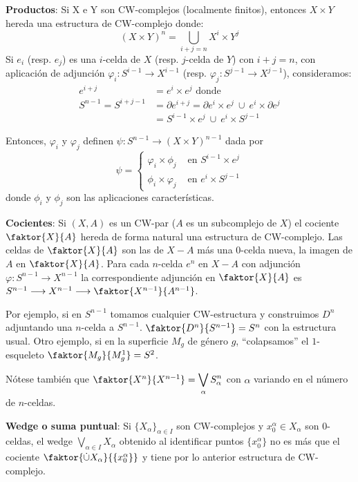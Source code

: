 \textbf{Productos}:  Si X e Y son CW-complejos (localmente finitos), entonces $X \times Y$ hereda una estructura de CW-complejo donde:
\[ (X \times Y)^n = \bigcup_{i+j=n} X^i \times Y^j \]
Si $e_i$ (resp. $e_j$) es una $i$-celda de $X$ (resp. $j$-celda de $Y$) con $i+j=n$, con aplicación de adjunción $\varphi_i : S^{i-1} \longrightarrow X^{i-1}$ (resp. $\varphi_j : S^{j-1} \longrightarrow X^{j-1}$), consideramos:
\begin{align*} 
e^{i+j} &= e^i \times e^j \text{ donde } \\
S^{n-1} = S^{i+j-1} &= \partial e^{i+j} = \partial e^i \times e^j \ \cup \ e^i \times \partial e^j \\
&= S^{i-1} \times e^j \ \cup \ e^i \times S^{j-1}
\end{align*}

Entonces, $\varphi_i$ y $\varphi_j$ definen $\psi : S^{n-1} \longrightarrow (X \times Y)^{n-1}$ dada por 
\[ \psi = \begin{cases}
\varphi_i  \times \phi_j & \text{ en } S^{i-1} \times e^j \\
\phi_i \times \varphi_j & \text{ en } e^i \times S^{j-1}
\end{cases} \]
donde $\phi_i$ y $\phi_j$ son las aplicaciones características. \par 

\textbf{Cocientes}: Si $(X, A)$ es un CW-par ($A$ es un subcomplejo de $X$) el cociente $\faktor{X}{A}$ hereda de forma natural una estructura de CW-complejo. Las celdas de $\faktor{X}{A}$ son las de $X - A$ más una $0$-celda nueva, la imagen de $A$ en $\faktor{X}{A}$. Para cada $n$-celda $e^n$ en $X - A$ con adjunción $\varphi : S^{n-1} \longrightarrow X^{n-1}$ la correspondiente adjunción en $\faktor{X}{A}$ es $S^{n-1} \longrightarrow X^{n-1} \longrightarrow \faktor{X^{n-1}}{A^{n-1}}$. \par
Por ejemplo, si en $S^{n-1}$ tomamos cualquier CW-estructura y construimos $D^n$ adjuntando una $n$-celda a $S^{n-1}$. $\faktor{D^n}{S^{n-1}} = S^n$ con la estructura usual. Otro ejemplo, si en la superficie $M_g$ de género $g$,  ``colapsamos'' el $1$-esqueleto $\faktor{M_g}{M_g^1} = S^2$. \par 
Nótese también que $\faktor{X^n}{X^{n-1}} = \displaystyle \bigvee_\alpha S_\alpha^n$ con $\alpha$ variando en el número de $n$-celdas. \par 

\textbf{Wedge o suma puntual}: Si $\{X_\alpha \}_{\alpha \in I}$ son CW-complejos y $x_0^\alpha \in X_\alpha$  son $0$-celdas, el wedge $\bigvee_{\alpha \in I} X_\alpha$ obtenido al identificar puntos $\{x_0^\alpha \}$ no es más que el cociente $\faktor{\dot{\cup} X_\alpha}{\{x_0^\alpha\}}$ y tiene por lo anterior estructura de CW-complejo. \par

